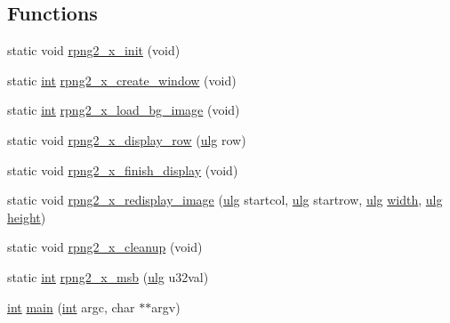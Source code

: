 \subsection*{Functions}
\begin{DoxyCompactItemize}
\item 
static void \mbox{\hyperlink{rpng2-x_8c_ab20ab6bc14c0853af2e0e7698125174e}{rpng2\+\_\+x\+\_\+init}} (void)
\item 
static \mbox{\hyperlink{ioapi_8h_a787fa3cf048117ba7123753c1e74fcd6}{int}} \mbox{\hyperlink{rpng2-x_8c_aa1d3f0f82dec46874ea19ffa781cb1f7}{rpng2\+\_\+x\+\_\+create\+\_\+window}} (void)
\item 
static \mbox{\hyperlink{ioapi_8h_a787fa3cf048117ba7123753c1e74fcd6}{int}} \mbox{\hyperlink{rpng2-x_8c_ad02636450f027c837e6a3fbbe7a81829}{rpng2\+\_\+x\+\_\+load\+\_\+bg\+\_\+image}} (void)
\item 
static void \mbox{\hyperlink{rpng2-x_8c_a249f2f9baf0276621e94b788cd6d34c3}{rpng2\+\_\+x\+\_\+display\+\_\+row}} (\mbox{\hyperlink{readpng_8h_abd6f60bf9450af2ecb94097a32c19a64}{ulg}} row)
\item 
static void \mbox{\hyperlink{rpng2-x_8c_ab1a527797f2c8d50003040e0af0b0fc9}{rpng2\+\_\+x\+\_\+finish\+\_\+display}} (void)
\item 
static void \mbox{\hyperlink{rpng2-x_8c_affab9dec431ea4b549e6ced6d3e416f5}{rpng2\+\_\+x\+\_\+redisplay\+\_\+image}} (\mbox{\hyperlink{readpng_8h_abd6f60bf9450af2ecb94097a32c19a64}{ulg}} startcol, \mbox{\hyperlink{readpng_8h_abd6f60bf9450af2ecb94097a32c19a64}{ulg}} startrow, \mbox{\hyperlink{readpng_8h_abd6f60bf9450af2ecb94097a32c19a64}{ulg}} \mbox{\hyperlink{readppm_8c_a59b7c57bf1dc7c36ac7c8232cf5bb713}{width}}, \mbox{\hyperlink{readpng_8h_abd6f60bf9450af2ecb94097a32c19a64}{ulg}} \mbox{\hyperlink{readppm_8c_ac8b624a7354198da45f5797b93b883c9}{height}})
\item 
static void \mbox{\hyperlink{rpng2-x_8c_aca1959fe9e81b967dfd94fa218c72e84}{rpng2\+\_\+x\+\_\+cleanup}} (void)
\item 
static \mbox{\hyperlink{ioapi_8h_a787fa3cf048117ba7123753c1e74fcd6}{int}} \mbox{\hyperlink{rpng2-x_8c_a6d049c205a7e333060fd97d7a41e71ff}{rpng2\+\_\+x\+\_\+msb}} (\mbox{\hyperlink{readpng_8h_abd6f60bf9450af2ecb94097a32c19a64}{ulg}} u32val)
\item 
\mbox{\hyperlink{ioapi_8h_a787fa3cf048117ba7123753c1e74fcd6}{int}} \mbox{\hyperlink{rpng2-x_8c_a3c04138a5bfe5d72780bb7e82a18e627}{main}} (\mbox{\hyperlink{ioapi_8h_a787fa3cf048117ba7123753c1e74fcd6}{int}} argc, char $\ast$$\ast$argv)
\end{DoxyCompactItemize}
